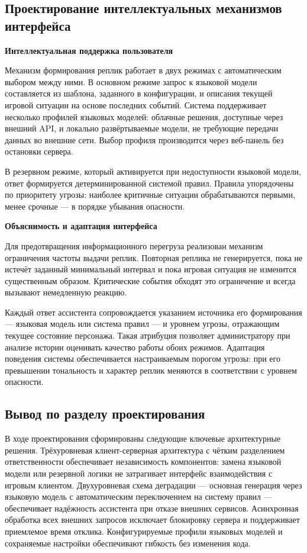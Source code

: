\subsection{Проектирование интеллектуальных механизмов интерфейса}

\textbf{Интеллектуальная поддержка пользователя}

Механизм формирования реплик работает в двух режимах с автоматическим выбором между ними. В основном режиме запрос к языковой модели составляется из шаблона, заданного в конфигурации, и описания текущей игровой ситуации на основе последних событий. Система поддерживает несколько профилей языковых моделей: облачные решения, доступные через внешний API, и локально развёртываемые модели, не требующие передачи данных во внешние сети. Выбор профиля производится через веб-панель без остановки сервера.

В резервном режиме, который активируется при недоступности языковой модели, ответ формируется детерминированной системой правил. Правила упорядочены по приоритету угрозы: наиболее критичные ситуации обрабатываются первыми, менее срочные — в порядке убывания опасности.

\textbf{Объяснимость и адаптация интерфейса}

Для предотвращения информационного перегруза реализован механизм ограничения частоты выдачи реплик. Повторная реплика не генерируется, пока не истечёт заданный минимальный интервал и пока игровая ситуация не изменится существенным образом. Критические события обходят это ограничение и всегда вызывают немедленную реакцию.

Каждый ответ ассистента сопровождается указанием источника его формирования — языковая модель или система правил — и уровнем угрозы, отражающим текущее состояние персонажа. Такая атрибуция позволяет администратору при анализе истории оценивать качество работы обоих режимов. Адаптация поведения системы обеспечивается настраиваемым порогом угрозы: при его превышении тональность и характер реплик меняются в соответствии с уровнем опасности.

\subsection{Вывод по разделу проектирования}

В ходе проектирования сформированы следующие ключевые архитектурные решения. Трёхуровневая клиент-серверная архитектура с чётким разделением ответственности обеспечивает независимость компонентов: замена языковой модели или резервной логики не затрагивает интерфейс взаимодействия с игровым клиентом. Двухуровневая схема деградации — основная генерация через языковую модель с автоматическим переключением на систему правил — обеспечивает надёжность ассистента при отказе внешних сервисов. Асинхронная обработка всех внешних запросов исключает блокировку сервера и поддерживает приемлемое время отклика. Конфигурируемые профили языковых моделей и сохраняемые настройки обеспечивают гибкость без изменения кода.


